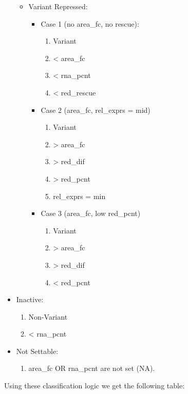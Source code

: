 \documentclass[11pt]{article}
\begin{document}
\begin{itemize}
\begin{itemize}
\item Variant Repressed:
\begin{itemize}
\item Case 1 (no area\_fc, no rescue):
\begin{enumerate}
\item Variant
\item < area\_fc
\item < rna\_pcnt
\item < red\_rescue
\end{enumerate}
\item Case 2 (area\_fc, rel\_exprs = mid)
\begin{enumerate}
\item Variant
\item > area\_fc
\item > red\_dif
\item > red\_pcnt
\item rel\_exprs = min
\end{enumerate}
\item Case 3 (area\_fc, low red\_pcnt)
\begin{enumerate}
\item Variant
\item > area\_fc
\item > red\_dif
\item < red\_pcnt
\end{enumerate}
\end{itemize}
\end{itemize}

\item Inactive:
\begin{enumerate}
\item Non-Variant
\item < rna\_pcnt
\end{enumerate}

\item Not Settable:
\begin{enumerate}
\item area\_fc OR rna\_pcnt are not set (NA).
\end{enumerate}
\end{itemize}

Using these classification logic we get the following table:
\end{document}
